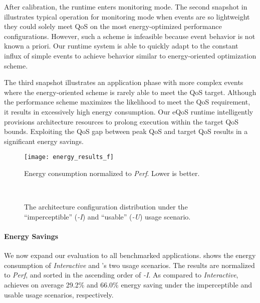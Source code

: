 After calibration, the runtime enters monitoring mode. The second snapshot in~ illustrates typical operation for monitoring mode when events are so lightweight they could solely meet QoS on the most energy-optimized performance configurations. However, such a scheme is infeasible because event behavior is not known a priori. Our runtime system is able to quickly adapt to the constant influx of simple events to achieve behavior similar to energy-oriented optimization scheme.

The third snapshot illustrates an application phase with more complex events where the energy-oriented scheme is rarely able to meet the QoS target. Although the performance scheme maximizes the likelihood to meet the QoS requirement, it results in excessively high energy consumption. Our eQoS runtime intelligently provisions architecture resources to prolong execution within the target QoS bounds. Exploiting the QoS gap between peak QoS and target QoS results in a significant energy savings.

\begin{figure}[t]
\centering
\texttt{[image: energy\_results\_f]}
\caption{Energy consumption normalized to \textit{Perf}. Lower is better.}
\label{fig:energy_results_f}
\end{figure}

\begin{figure}[p]
\centering
{}\\
\vspace*{25pt}
\caption{The architecture configuration distribution under the ``imperceptible'' (\textit{\ebs-I}) and ``usable''  (\textit{\ebs-U}) usage scenario.}
\label{fig:freq_dist}
\end{figure}

\paragraph{Energy Savings} We now expand our evaluation to all benchmarked applications.  shows the energy consumption of \textit{Interactive} and \ebs's two usage scenarios. The results are normalized to \textit{Perf}, and sorted in the ascending order of \textit{\ebs-I}. As compared to \textit{Interactive}, \ebs achieves on average 29.2\% and 66.0\% energy saving under the imperceptible and usable usage scenarios, respectively.

